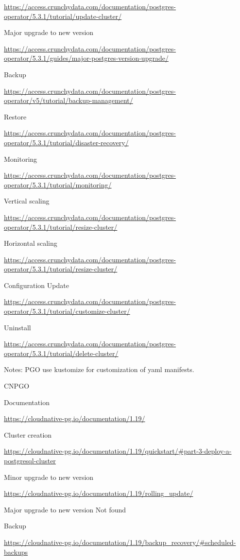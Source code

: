 \url{https://access.crunchydata.com/documentation/postgres-operator/5.3.1/tutorial/update-cluster/}

Major upgrade to new version

\url{https://access.crunchydata.com/documentation/postgres-operator/5.3.1/guides/major-postgres-version-upgrade/}

Backup

\url{https://access.crunchydata.com/documentation/postgres-operator/v5/tutorial/backup-management/}

Restore

\url{https://access.crunchydata.com/documentation/postgres-operator/5.3.1/tutorial/disaster-recovery/}

Monitoring

\url{https://access.crunchydata.com/documentation/postgres-operator/5.3.1/tutorial/monitoring/}

Vertical scaling

\url{https://access.crunchydata.com/documentation/postgres-operator/5.3.1/tutorial/resize-cluster/}

Horizontal scaling

\url{https://access.crunchydata.com/documentation/postgres-operator/5.3.1/tutorial/resize-cluster/}

Configuration Update

\url{https://access.crunchydata.com/documentation/postgres-operator/5.3.1/tutorial/customize-cluster/}

Uninstall

\url{https://access.crunchydata.com/documentation/postgres-operator/5.3.1/tutorial/delete-cluster/}

Notes: PGO use kustomize for customization of yaml manifests.

CNPGO

Documentation

\url{https://cloudnative-pg.io/documentation/1.19/}

Cluster creation

\url{https://cloudnative-pg.io/documentation/1.19/quickstart/#part-3-deploy-a-postgresql-cluster}

Minor upgrade to new version

\url{https://cloudnative-pg.io/documentation/1.19/rolling_update/}

Major upgrade to new version
Not found

Backup

\url{https://cloudnative-pg.io/documentation/1.19/backup_recovery/#scheduled-backups}

